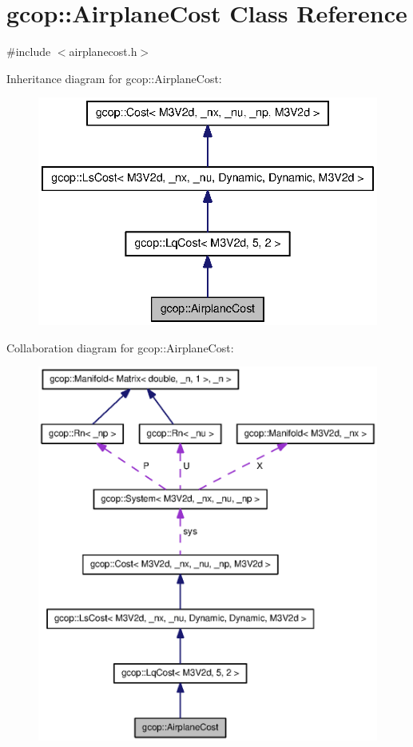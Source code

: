 \section{gcop\-:\-:\-Airplane\-Cost \-Class \-Reference}
\label{classgcop_1_1AirplaneCost}


{\ttfamily \#include $<$airplanecost.\-h$>$}



\-Inheritance diagram for gcop\-:\-:\-Airplane\-Cost\-:
\nopagebreak
\begin{figure}[H]
\begin{center}
\leavevmode
\includegraphics[width=338pt]{classgcop_1_1AirplaneCost__inherit__graph}
\end{center}
\end{figure}


\-Collaboration diagram for gcop\-:\-:\-Airplane\-Cost\-:
\nopagebreak
\begin{figure}[H]
\begin{center}
\leavevmode
\includegraphics[width=350pt]{classgcop_1_1AirplaneCost__coll__graph}
\end{center}
\end{figure}
